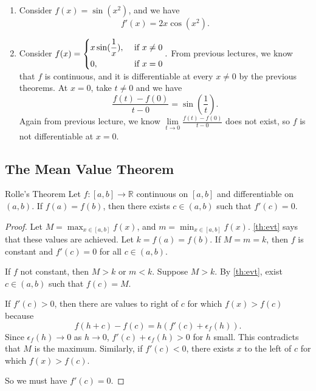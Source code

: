 \begin{example}
    \leavevmode
    \begin{enumerate}
        \item Consider \(f(x) = \sin (x^2)\), and we have
        \[
            f'(x) = 2x \cos (x^2).
        \]
        \item Consider \(f(x) = \begin{dcases}
            x \sin (\frac{1}{x}), &\text{ if }x\neq 0 \\
            0, &\text{ if }x=0 \\
        \end{dcases}.\) From previous lectures, we know that \(f\) is continuous, and it is differentiable at every \(x \neq 0\) by the previous theorems. At \(x = 0\), take \(t \neq 0\) and we have
        \[
            \frac{f(t) - f(0)}{t-0}= \sin(\frac{1}{t}).
        \]
        Again from previous lecture, we know \(\lim\limits_{t \to 0} \frac{f(t) - f(0)}{t-0}\) does not exist, so \(f\) is not differentiable at \(x = 0\).
    \end{enumerate}
\end{example}
\subsection{The Mean Value Theorem}
\leavevmode
\begin{theorem}{Rolle's Theorem}
    Let \(f: [a,b] \to \mathbb{R}\) continuous on \([a,b]\) and differentiable on \((a,b)\). If \(f(a) = f(b)\), then there exists \(c \in (a,b)\) such that \(f'(c) = 0\).
\end{theorem}
\begin{proof}
    Let \(M = \mathop{\max}_{x \in [a,b]} f(x)\), and \(m = \mathop{\min}_{x \in [a,b]} f(x)\). \cref{th:evt} says that these values are achieved. Let \(k = f(a) = f(b)\). If \(M = m = k\), then \(f\) is constant and \(f'(c) = 0\) for all \(c \in (a,b)\).

    If \(f\) not constant, then \(M > k\) or \(m < k\). Suppose \(M > k\). By \cref{th:evt}, exist \(c \in (a,b)\) such that \(f(c) = M\).

    If \(f'(c) > 0\), then there are values to right of \(c\) for which \(f(x) > f(c)\) because
    \[f(h + c) - f(c) = h(f'(c) + \epsilon_f(h)).\]
    Since \(\epsilon_f(h) \to 0\) as \(h \to 0\), \(f'(c) + \epsilon_f(h) > 0\) for \(h\) small. This contradicts that \(M\) is the maximum. Similarly, if \(f'(c) < 0\), there exists \(x\) to the left of \(c\) for which \(f(x) > f(c)\).

    So we must have \(f'(c) = 0\).
\end{proof}